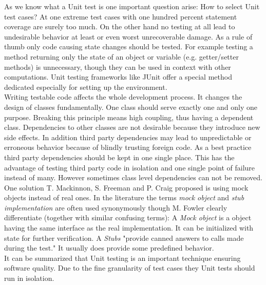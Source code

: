 \documentclass[12pt, notitlepage]{article}
\begin{document}
As we know what a Unit test is one important question arise: How to select Unit test cases? At one extreme test cases with one hundred percent statement coverage
are surely too much. On the other hand no testing at all lead to undesirable behavior at least or even worst unrecoverable damage. 
As a rule of thumb only code causing state changes should be tested. For example testing a method returning only the state of an object or variable (e.g. getter/setter methods) is unnecessary, though they can be used in context with other computations. Unit testing frameworks 
like JUnit\cite{junit} offer a special method dedicated especially for setting up the environment.\\
Writing testable code affects the whole development process. It changes the design of classes fundamentally. One class should serve exactly one and only one purpose. Breaking this principle means high coupling, thus having a dependent class. Dependencies to other classes are not desirable because they introduce new
side effects. In addition third party dependencies may lead to unpredictable or erroneous behavior because of blindly trusting foreign code.
As a best practice third party dependencies should be kept in one single place. This has the advantage of testing third party code in isolation 
and one single point of failure instead of many. However sometimes class level dependencies can not be removed.
One solution T. Mackinnon, S. Freeman and P. Craig proposed\cite{mock-objects} is using mock objects instead of real ones. In the literature the terms \textit{mock object} and \textit{stub implementation} are often used synonymously though M. Fowler clearly differentiate\cite{fowlermocks} (together with similar confusing terms): A \textit{Mock object} is a object having the same interface as the real implementation. It can be initialized with state for further verification. 
A \textit{Stubs} "provide canned answers to calls made during the test." It usually does provide some predefined behavior.\\ 
It can be summarized that Unit testing is an important technique ensuring software quality. Due to the fine granularity of test cases they Unit tests 
should run in isolation. 
\end{document}
